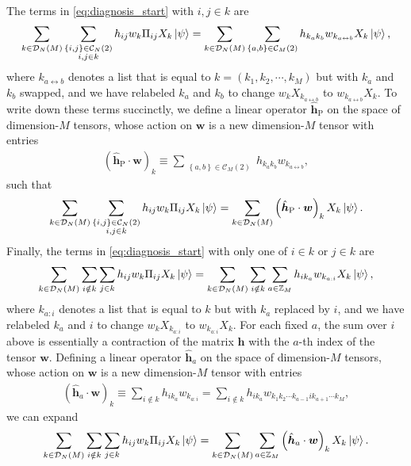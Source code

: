 \documentclass[nofootinbib,notitlepage,11pt]{revtex4-2}
\renewcommand{\t}{\text} %
\newcommand{\p}[1]{\left(#1\right)} %
\renewcommand{\set}[1]{\left\{#1\right\}} %
\renewcommand{\c}{\cdot} %
\newcommand{\m}{\bm} %
\newcommand{\1}{\mathds{1}}
\renewcommand{\i}{\mathrm{i}\mkern1mu}
\newcommand{\C}{\mathcal{C}}
\newcommand{\D}{\mathcal{D}}
\newcommand{\ZZ}{\mathbb{Z}}
\newcommand{\lra}{\leftrightarrow}
\begin{document}
The terms in \eqref{eq:diagnosis_start} with $i,j\in k$ are
\begin{align}
  \sum_{k\in\D_N\p{M}} \sum_{\substack{\set{i,j}\in\C_N\p{2}\\i,j\in k}}
  h_{ij} w_k \Pi_{ij} X_k \ket\psi
  = \sum_{k\in\D_N\p{M}} \sum_{\substack{\set{a,b}\in\C_M\p{2}}}
  h_{k_ak_b} w_{k_{a\lra b}} X_k \ket\psi,
\end{align}
where $k_{a\lra b}$ denotes a list that is equal to
$k=\p{k_1,k_2,\cdots,k_M}$ but with $k_a$ and $k_b$ swapped, and we
have relabeled $k_a$ and $k_b$ to change $w_k X_{k_{a\lra b}}$ to
$w_{k_{a\lra b}} X_k$.  To write down these terms succinctly, we
define a linear operator $\hat{\m h}_{\t{P}}$ on the space of
dimension-$M$ tensors, whose action on $\m w$ is a new dimension-$M$
tensor with entries
\begin{align}
  \p{\hat{\m h}_{\t{P}} \c \m w}_k
  \equiv \sum_{\substack{\set{a,b}\in\C_M\p{2}}}
  h_{k_ak_b} w_{k_{a\lra b}},
  \label{eq:multi_body_op_perm}
\end{align}
such that
\begin{align}
  \sum_{k\in\D_N\p{M}} \sum_{\substack{\set{i,j}\in\C_N\p{2}\\i,j\in k}}
  h_{ij} w_k \Pi_{ij} X_k \ket\psi
  = \sum_{k\in\D_N\p{M}} \p{\hat{\m h}_{\t{P}} \c \m w}_k X_k \ket\psi.
\end{align}
Finally, the terms in \eqref{eq:diagnosis_start} with only one of
$i\in k$ or $j\in k$ are
\begin{align}
  \sum_{k\in\D_N\p{M}} \sum_{i\notin k} \sum_{j\in k}
  h_{ij} w_k \Pi_{ij} X_k \ket\psi
  = \sum_{k\in\D_N\p{M}} \sum_{i\notin k}
  \sum_{a\in\ZZ_M} h_{ik_a} w_{k_{a:i}} X_k \ket\psi,
\end{align}
where $k_{a:i}$ denotes a list that is equal to $k$ but with $k_a$
replaced by $i$, and we have relabeled $k_a$ and $i$ to change
$w_k X_{k_{a:i}}$ to $w_{k_{a:i}} X_k$.  For each fixed $a$, the sum
over $i$ above is essentially a contraction of the matrix $\m h$ with
the $a$-th index of the tensor $\m w$.  Defining a linear operator
$\hat{\m h}_a$ on the space of dimension-$M$ tensors, whose action on
$\m w$ is a new dimension-$M$ tensor with entries
\begin{align}
  \p{\hat{\m h}_a\c\m w}_k
  \equiv \sum_{i\notin k} h_{ik_a} w_{k_{a:i}}
  = \sum_{i\notin k}
  h_{ik_a} w_{k_1 k_2 \cdots k_{a-1} i k_{a+1} \cdots k_M},
  \label{eq:multi_body_op_contract}
\end{align}
we can expand
\begin{align}
  \sum_{k\in\D_N\p{M}} \sum_{i\notin k} \sum_{j\in k}
  h_{ij} w_k \Pi_{ij} X_k \ket\psi
  = \sum_{k\in\D_N\p{M}} \sum_{a\in\ZZ_M}
  \p{\hat{\m h}_a\c\m w}_k X_k \ket\psi.
\end{align}
\end{document}
